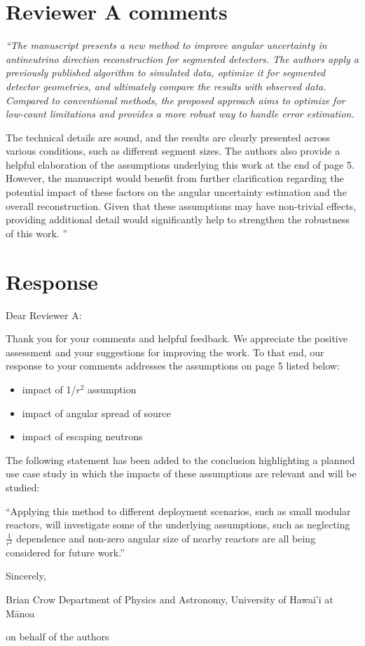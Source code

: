 \section{Reviewer A comments}
{\it 
``The manuscript presents a new method to improve angular uncertainty in antineutrino direction reconstruction for segmented detectors. The authors apply a previously published algorithm to simulated data, optimize it for segmented detector geometries, and ultimately compare the results with observed data. Compared to conventional methods, the proposed approach aims to optimize for low-count limitations and provides a more robust way to handle error estimation.

The technical details are sound, and the results are clearly presented across various conditions, such as different segment sizes. The authors also provide a helpful elaboration of the assumptions underlying this work at the end of page 5. However, the manuscript would benefit from further clarification regarding the potential impact of these factors on the angular uncertainty estimation and the overall reconstruction. Given that these assumptions may have non-trivial effects, providing additional detail would significantly help to strengthen the robustness of this work.
''
}

\section{Response}

Dear Reviewer A:

Thank you for your comments and helpful feedback. We appreciate the positive assessment and your suggestions for improving the work. To that end, our response to your comments addresses the assumptions on page 5 listed below:

\begin{itemize}
    \item impact of 1/\(r^2\) assumption
    \item impact of angular spread of source
    \item impact of escaping neutrons
\end{itemize}

The following statement has been added to the conclusion highlighting a planned use case study in which the impacts of these assumptions are relevant and will be studied:

``Applying this method to different deployment scenarios, such as small modular reactors, will investigate some of the underlying assumptions, such as neglecting \(\frac{1}{r^2}\) dependence and non-zero angular size of nearby reactors are all being considered for future work.''

Sincerely,

Brian Crow
Department of Physics and Astronomy, University of Hawai'i at M\={a}noa

on behalf of the authors